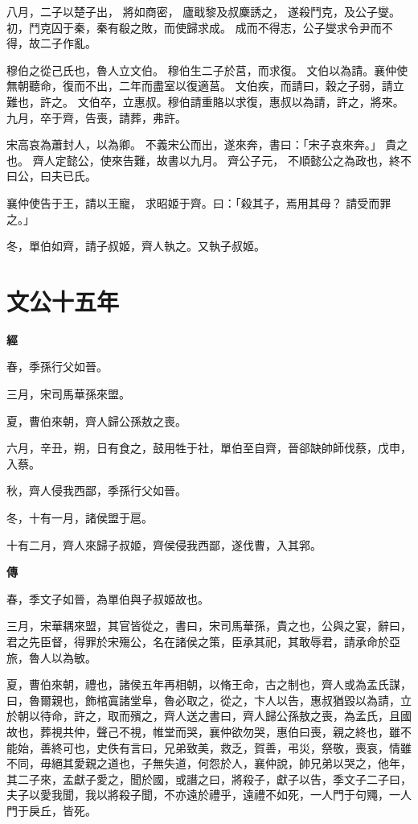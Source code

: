 \documentclass{ctexart}
\begin{document}
八月，二子以楚子出，
將如商密，
廬戢黎及叔麇誘之，
遂殺鬥克，及公子燮。
初，鬥克囚于秦，秦有殽之敗，而使歸求成。
成而不得志，公子燮求令尹而不得，故二子作亂。

穆伯之從己氏也，魯人立文伯。
穆伯生二子於莒，而求復。
文伯以為請。襄仲使無朝聽命，復而不出，二年而盡室以復適莒。
文伯疾，而請曰，穀之子弱，請立難也，許之。
文伯卒，立惠叔。穆伯請重賂以求復，惠叔以為請，許之，將來。
九月，卒于齊，告喪，請葬，弗許。

宋高哀為蕭封人，以為卿。
不義宋公而出，遂來奔，書曰：「宋子哀來奔。」
貴之也。
齊人定懿公，使來告難，故書以九月。
齊公子元，
不順懿公之為政也，終不曰公，曰夫已氏。

襄仲使告于王，請以王寵，
求昭姬于齊。曰：「殺其子，焉用其母？
請受而罪之。」

冬，單伯如齊，請子叔姬，齊人執之。又執子叔姬。





\section{文公十五年}


\textbf{經}



春，季孫行父如晉。

三月，宋司馬華孫來盟。

夏，曹伯來朝，齊人歸公孫敖之喪。

六月，辛丑，朔，日有食之，鼓用牲于社，單伯至自齊，晉郤缺帥師伐蔡，戊申，入蔡。

秋，齊人侵我西鄙，季孫行父如晉。

冬，十有一月，諸侯盟于扈。

十有二月，齊人來歸子叔姬，齊侯侵我西鄙，遂伐曹，入其郛。

\textbf{傳}



春，季文子如晉，為單伯與子叔姬故也。

三月，宋華耦來盟，其官皆從之，書曰，宋司馬華孫，貴之也，公與之宴，辭曰，君之先臣督，得罪於宋殤公，名在諸侯之策，臣承其祀，其敢辱君，請承命於亞旅，魯人以為敏。

夏，曹伯來朝，禮也，諸侯五年再相朝，以脩王命，古之制也，齊人或為孟氏謀，曰，魯爾親也，飾棺寘諸堂阜，魯必取之，從之，卞人以告，惠叔猶毀以為請，立於朝以待命，許之，取而殯之，齊人送之書曰，齊人歸公孫敖之喪，為孟氏，且國故也，葬視共仲，聲己不視，帷堂而哭，襄仲欲勿哭，惠伯曰喪，親之終也，雖不能始，善終可也，史佚有言曰，兄弟致美，救乏，賀善，弔災，祭敬，喪哀，情雖不同，毋絕其愛親之道也，子無失道，何怨於人，襄仲說，帥兄弟以哭之，他年，其二子來，孟獻子愛之，聞於國，或譖之曰，將殺子，獻子以告，季文子二子曰，夫子以愛我聞，我以將殺子聞，不亦遠於禮乎，遠禮不如死，一人門于句鼆，一人門于戾丘，皆死。
\end{document}
